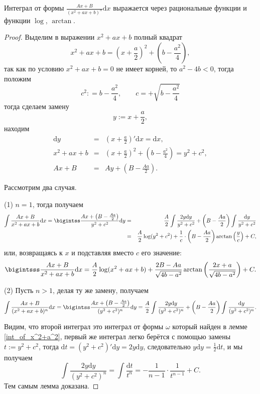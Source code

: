 \begin{lemma}\label{int_of_prime} Интеграл от формы $\frac{Ax + B}{(x^2 + ax + b)^n}\mathrm{d}x$ выражается через рациональные функции и функции $\log$, $\arctan$.
\end{lemma}
\begin{proof}
Выделим в выражении $x^2 + ax + b$ полный квадрат
\[
 x^2 + ax + b = \left(x+ \frac{a}{2} \right)^2 + \left(b - \frac{a^2}{4} \right),
\]
так как по условию $x^2 + ax + b =0$ не имеет корней, то $a^2 - 4b <0$, тогда положим 
\[
 c^2: = b- \frac{a^2}{4}, \qquad c = + \sqrt{b- \frac{a^2}{4}}
\]
тогда сделаем замену 
\[
y:= x+ \frac{a}{2},
\]
находим
\begin{eqnarray*}
    \mathrm{d}y &=& \left( x+ \frac{a}{2}\right)' \mathrm{d}x = \mathrm{d}x,\\
    x^2 + ax + b &=& \left(x+ \frac{a}{2} \right)^2 + \left(b - \frac{a^2}{4} \right) = y^2 + c^2, \\
    Ax + B &= & Ay + \left(B - \frac{Aa}{2} \right).
\end{eqnarray*}

Рассмотрим два случая.

(1) $n = 1$, тогда получаем
\begin{eqnarray*}
    \int \frac{Ax + B}{x^2 + ax + b}\mathrm{d}x = \bigintss \frac{Ax + \left( B - \frac{Aa}{2} \right)}{y^2 + c^2}\mathrm{d}y &=& \frac{A}{2} \int \frac{2y\mathrm{d}y}{y^2 + c^2} + \left( B - \frac{Aa}{2} \right) \int \frac{\mathrm{d}y}{y^2 + c^2} \\
    &=& \frac{A}{2} \log(y^2 + c^2) + \frac{1}{c} \cdot \left( B - \frac{Aa}{2} \right)\arctan\left(\frac{y}{c}\right) + C,
\end{eqnarray*}
или, возвращаясь к $x$ и подставляя вместо $c$ его значение:
  \[
   \bigintsss \frac{Ax + B}{x^2 + ax + b}\mathrm{d}x =  \frac{A}{2}\log(x^2 + ax + b) + \frac{2B-Aa}{\sqrt{4b-a^2}}\arctan\left( \frac{2x+a}{\sqrt{4b-a^2}} \right) + C.
  \]

(2) Пусть $n >1$, делая ту же замену, получаем
\[
    \int \frac{Ax + B}{(x^2 + ax + b)^n}\mathrm{d}x = \bigintss \frac{Ax + \left( B - \frac{Aa}{2} \right)}{(y^2 + c^2)^n}\mathrm{d}y = \frac{A}{2} \int \frac{2y\mathrm{d}y}{(y^2 + c^2)^n} + \left( B - \frac{Aa}{2} \right) \int \frac{\mathrm{d}y}{(y^2 + c^2)^n}.
\]

Видим, что второй интеграл это интеграл от формы $\omega$ который найден в лемме \ref{int_of_x^2+a^2}, первый же интеграл легко берётся с помощью замены $t:=y^2 + c^2 $, тогда $\mathrm{d}t = (y^2 + c^2)'\mathrm{d}y = 2y\mathrm{d}y$, следовательно $y\mathrm{d}y = \frac{1}{2}\mathrm{d}t$, и мы получаем
\[
 \int \frac{2y\mathrm{d}y}{(y^2 + c^2)^n} = \int \frac{\mathrm{d}t}{t^n} = - \frac{1}{n-1}\cdot \frac{1}{t^{n-1}} +C.
\]
Тем самым лемма доказана.
\end{proof}

